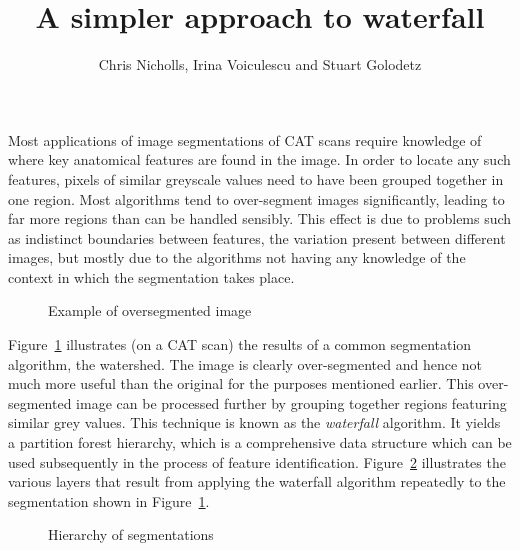 \documentclass[12pt]{ouclprgsc}
\title{\LARGE \bf
A simpler approach to waterfall
}
\author{Chris Nicholls, Irina Voiculescu and Stuart Golodetz
}
\institute{Oxford University Computing Laboratory}
\begin{document}
\maketitle
\pagestyle{empty}



Most applications of image segmentations of CAT scans require
knowledge of where key anatomical features are found in the image. In
order to locate any such features, pixels of similar greyscale values
need to have been grouped together in one region. Most algorithms tend
to over-segment images significantly, leading to far more regions than
can be handled sensibly. This effect is due to problems such as
indistinct boundaries between features, the variation present between
different images, but mostly due to the algorithms not having any
knowledge of the context in which the segmentation takes place.

\begin{figure}
\centering
\ifpdf
        {}%
\else
\fi
\caption{Example of oversegmented image}
\label{fig:oversegmented}
\end{figure}

Figure~\ref{fig:oversegmented} illustrates (on a CAT scan) the results
of a common segmentation algorithm, the watershed. The image is
clearly over-segmented and hence not much more useful than the
original for the purposes mentioned earlier. This over-segmented image
can be processed further by grouping together regions featuring
similar grey values. This technique is known as the {\em waterfall\/}
algorithm. It yields a partition forest hierarchy, which is a
comprehensive data structure which can be used subsequently in the
process of feature identification.
Figure~\ref{fig:waterfall} illustrates the various layers that result
from applying the waterfall algorithm repeatedly to the segmentation
shown in Figure~\ref{fig:oversegmented}.

\begin{figure}
\centering
\ifpdf
        \hspace{4mm}%
        \hspace{4mm}%
        \hspace{4mm}%
        \hspace{4mm}%
\else
\fi
\caption{Hierarchy of segmentations}
\label{fig:waterfall}
\end{figure}
\end{document}
